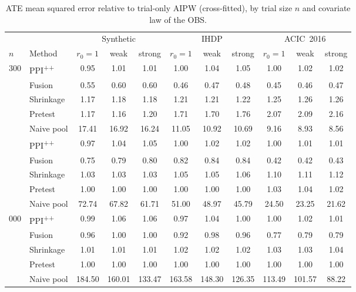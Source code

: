 \begin{table}[h]
\caption{ATE mean squared error relative to trial-only AIPW (cross-fitted), by trial size $n$ and covariate law of the OBS.}
\label{tab:app-ate-ratio}
\begin{center}\footnotesize
\begin{tabular}{@{}llccccccccc@{}}
\toprule
& & \multicolumn{3}{c}{Synthetic} & \multicolumn{3}{c}{IHDP} & \multicolumn{3}{c}{ACIC~2016}\\
\cmidrule(lr){3-5}\cmidrule(lr){6-8}\cmidrule(lr){9-11}
$n$ & Method & $r_0{=}1$ & weak & strong & $r_0{=}1$ & weak & strong & $r_0{=}1$ & weak & strong\\
\midrule
300 & PPI\textsuperscript{++} & 0.95 & 1.01 & 1.01 & 1.00 & 1.04 & 1.05 & 1.00 & 1.02 & 1.02 \\
 & Fusion & 0.55 & 0.60 & 0.60 & 0.46 & 0.47 & 0.48 & 0.45 & 0.46 & 0.47 \\
 & Shrinkage & 1.17 & 1.18 & 1.18 & 1.21 & 1.21 & 1.22 & 1.25 & 1.26 & 1.26 \\
 & Pretest & 1.17 & 1.16 & 1.20 & 1.71 & 1.70 & 1.76 & 2.07 & 2.09 & 2.16 \\
 & Naive pool & 17.41 & 16.92 & 16.24 & 11.05 & 10.92 & 10.69 & 9.16 & 8.93 & 8.56 \\
\addlinespace
900 & PPI\textsuperscript{++} & 0.97 & 1.04 & 1.05 & 1.00 & 1.02 & 1.02 & 1.00 & 1.01 & 1.01 \\
 & Fusion & 0.75 & 0.79 & 0.80 & 0.82 & 0.84 & 0.84 & 0.42 & 0.42 & 0.43 \\
 & Shrinkage & 1.03 & 1.03 & 1.03 & 1.05 & 1.05 & 1.06 & 1.10 & 1.11 & 1.12 \\
 & Pretest & 1.00 & 1.00 & 1.00 & 1.00 & 1.00 & 1.00 & 1.03 & 1.04 & 1.02 \\
 & Naive pool & 72.74 & 67.82 & 61.71 & 51.00 & 48.97 & 45.79 & 24.50 & 23.25 & 21.62 \\
\addlinespace
3{,}000 & PPI\textsuperscript{++} & 0.99 & 1.06 & 1.06 & 0.97 & 1.04 & 1.00 & 1.00 & 1.02 & 1.01 \\
 & Fusion & 0.96 & 1.00 & 1.00 & 0.92 & 0.98 & 0.96 & 0.77 & 0.79 & 0.79 \\
 & Shrinkage & 1.01 & 1.01 & 1.01 & 1.02 & 1.02 & 1.02 & 1.03 & 1.03 & 1.04 \\
 & Pretest & 1.00 & 1.00 & 1.00 & 1.00 & 1.00 & 1.00 & 1.00 & 1.00 & 1.00 \\
 & Naive pool & 184.50 & 160.01 & 133.47 & 163.58 & 148.30 & 126.35 & 113.49 & 101.57 & 88.22 \\
\bottomrule
\end{tabular}
\end{center}
\end{table}
